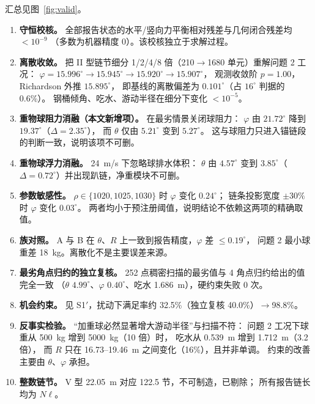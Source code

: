 \documentclass[UTF8,a4paper,zihao=-4]{ctexart}
\begin{document}
汇总见图~\ref{fig:valid}。

\begin{enumerate}[leftmargin=1.6em,itemsep=0.22em]
  \item \textbf{守恒校核。} 全部报告状态的水平/竖向力平衡相对残差与几何闭合残差均 \(<10^{-9}\)
        （多数为机器精度 0）。该校核独立于求解过程。
  \item \textbf{离散收敛。} 把 II 型链节细分 1/2/4/8 倍（210\(\to\)1680 单元）重解问题 2 工况：
        \(\varphi=15.996^\circ\to15.945^\circ\to15.920^\circ\to15.907^\circ\)，
        观测收敛阶 \(p=1.00\)，Richardson 外推 \(15.895^\circ\)，
        即基线的离散偏差为 \(0.101^\circ\)（占 \(16^\circ\) 判据的 0.6\%）。
        钢桶倾角、吃水、游动半径在细分下变化 \(<10^{-5}\)。
  \item \textbf{重物球阻力消融（本文新增项）。} 在最劣情景关闭球阻力：
        \(\varphi\) 由 \(21.72^\circ\) 降到 \(19.37^\circ\)（\(\Delta=2.35^\circ\)），
        而 \(\theta\) 仅由 \(5.21^\circ\) 变到 \(5.27^\circ\)。
        这与球阻力只进入锚链段的判断一致，说明该项不可删。
  \item \textbf{重物球浮力消融。} \SI{24}{m/s} 下忽略球排水体积：
        \(\theta\) 由 \(4.57^\circ\) 变到 \(3.85^\circ\)（\(\Delta=0.72^\circ\)）并出现趴链，净重模块不可删。
  \item \textbf{参数敏感性。} \(\rho\in\{1020,1025,1030\}\) 时 \(\varphi\) 变化 \(0.24^\circ\)；
        链条投影宽度 \(\pm30\%\) 时 \(\varphi\) 变化 \(0.03^\circ\)。
        两者均小于预注册阈值，说明结论不依赖这两项的精确取值。
  \item \textbf{族对照。} A 与 B 在 \(\theta\)、\(R\) 上一致到报告精度，\(\varphi\) 差 \(\le0.19^\circ\)，
        问题 2 最小球重差 \SI{18}{kg}。离散化不是主要误差来源。
  \item \textbf{最劣角点归约的独立复核。} 252 点稠密扫描的最劣值与 4 角点归约给出的值完全一致
        （\(\theta\) \(4.99^\circ\)、\(\varphi\) \(0.40^\circ\)、吃水 \SI{1.686}{m}），硬约束失败 0 次。
  \item \textbf{机会约束。} 见 S1\('\)，扰动下满足率约 32.5\%（独立复核 40.0\%）\(\to\)98.8\%。
  \item \textbf{反事实检验。} “加重球必然显著增大游动半径”与扫描不符：
        问题 2 工况下球重从 \SI{500}{kg} 增到 \SI{5000}{kg}（10 倍）时，
        吃水从 \SI{0.539}{m} 增到 \SI{1.712}{m}（3.2 倍），
        而 \(R\) 只在 16.73--\SI{19.46}{m} 之间变化（16\%），且并非单调。
        约束的改善主要由 \(\theta\)、\(\varphi\) 承担。
  \item \textbf{整数链节。} V 型 \SI{22.05}{m} 对应 122.5 节，不可制造，已剔除；
        所有报告链长均为 \(N\ell\)。
\end{enumerate}
\end{document}
